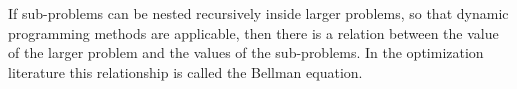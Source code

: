 \documentclass[a4paper]{article}
\begin{document}
If sub-problems can be nested recursively inside larger problems, so that dynamic programming methods are applicable, then there is a relation between the value of the larger problem and the values of the sub-problems.
In the optimization literature this relationship is called the Bellman equation.
\end{document}

